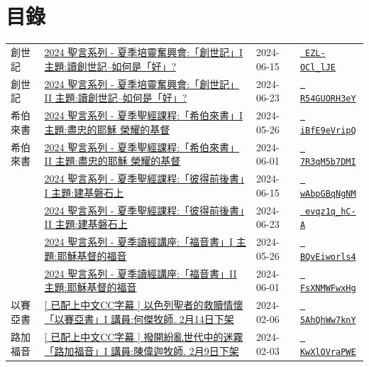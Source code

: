 \documentclass{book}
\begin{document}
\section{目錄}
\label{sec:index}
{ \scriptsize


\begin{xltabular}{\textwidth}{|p{0.15\textwidth} p{0.6\textwidth}|p{0.07\textwidth} p{0.1\textwidth}|}
\hline
創世記   & \hyperref[sec:EZL_OCl_lJE]{2024 聖言系列 - 夏季培靈奮興會:「創世記」I 主題:讀創世記–如何是「好」?} & 2024-06-15 & \href{https://youtube.com/watch?v=EZL-OCl_lJE}{\texttt{ EZL-OCl\_lJE}} \\
創世記   & \hyperref[sec:R54GUORH3eY]{2024 聖言系列 - 夏季培靈奮興會:「創世記」II 主題:讀創世記–如何是「好」?} & 2024-06-23 & \href{https://youtube.com/watch?v=R54GUORH3eY}{\texttt{ R54GUORH3eY}} \\
希伯來書   & \hyperref[sec:iBfE9eVripQ]{2024 聖言系列 - 夏季聖經課程:「希伯來書」I 主題:盡忠的耶穌 榮耀的基督} & 2024-05-26 & \href{https://youtube.com/watch?v=iBfE9eVripQ}{\texttt{ iBfE9eVripQ}} \\
希伯來書   & \hyperref[sec:7R3qM5b7DMI]{2024 聖言系列 - 夏季聖經課程:「希伯來書」II 主題:盡忠的耶穌 榮耀的基督} & 2024-06-01 & \href{https://youtube.com/watch?v=7R3qM5b7DMI}{\texttt{ 7R3qM5b7DMI}} \\
    & \hyperref[sec:wAbpGBqNgNM]{2024 聖言系列 - 夏季聖經課程:「彼得前後書」I 主題:建基磐石上} & 2024-06-15 & \href{https://youtube.com/watch?v=wAbpGBqNgNM}{\texttt{ wAbpGBqNgNM}} \\
    & \hyperref[sec:evqz1q_hC_A]{2024 聖言系列 - 夏季聖經課程:「彼得前後書」II 主題:建基磐石上} & 2024-06-23 & \href{https://youtube.com/watch?v=evqz1q_hC-A}{\texttt{ evqz1q\_hC-A}} \\
    & \hyperref[sec:BQvEiworls4]{2024 聖言系列 - 夏季讀經講座:「福音書」I 主題:耶穌基督的福音} & 2024-05-26 & \href{https://youtube.com/watch?v=BQvEiworls4}{\texttt{ BQvEiworls4}} \\
    & \hyperref[sec:FsXNMWFwxHg]{2024 聖言系列 - 夏季讀經講座:「福音書」II 主題:耶穌基督的福音} & 2024-06-01 & \href{https://youtube.com/watch?v=FsXNMWFwxHg}{\texttt{ FsXNMWFwxHg}} \\
以賽亞書   & \hyperref[sec:5AhQhWw7knY]{[ 已配上中文CC字幕 ] 以色列聖者的救贖情懷「以賽亞書」I 講員:何傑牧師. 2月14日下架} & 2024-02-06 & \href{https://youtube.com/watch?v=5AhQhWw7knY}{\texttt{ 5AhQhWw7knY}} \\
路加福音   & \hyperref[sec:KwXlOVraPWE]{[ 已配上中文CC字幕 ] 撥開紛亂世代中的迷霧「路加福音」I  講員:陳偉迦牧師. 2月9日下架} & 2024-02-03 & \href{https://youtube.com/watch?v=KwXlOVraPWE}{\texttt{ KwXlOVraPWE}} \\

\end{xltabular}}
\end{document}
